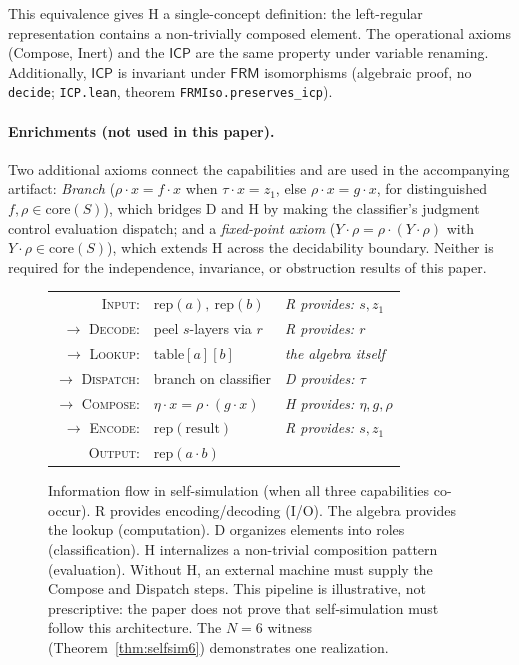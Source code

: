 \documentclass[sigconf,screen,review,anonymous]{acmart}
\newcommand{\dotop}{\cdot}
\newcommand{\FRM}{\textsf{FRM}}
\newcommand{\ICP}{\textsf{ICP}}
\newcommand{\core}{\mathrm{core}}
\theoremstyle{remark}
\begin{document}
This equivalence gives H a single-concept definition: the left-regular representation contains a non-trivially composed element. The operational axioms (Compose, Inert) and the $\ICP$ are the same property under variable renaming. Additionally, $\ICP$ is invariant under $\FRM$ isomorphisms (algebraic proof, no \texttt{decide}; \texttt{ICP.lean}, theorem \texttt{FRMIso.preserves\_icp}).

\paragraph{Enrichments (not used in this paper).}
Two additional axioms connect the capabilities and are used in the accompanying artifact: \emph{Branch} ($\rho \dotop x = f \dotop x$ when $\tau \dotop x = z_1$, else $\rho \dotop x = g \dotop x$, for distinguished $f, \rho \in \core(S)$), which bridges D and H by making the classifier's judgment control evaluation dispatch; and a \emph{fixed-point axiom} ($Y \dotop \rho = \rho \dotop (Y \dotop \rho)$ with $Y \dotop \rho \in \core(S)$), which extends H across the decidability boundary. Neither is required for the independence, invariance, or obstruction results of this paper.

\begin{figure}[t]
\centering
\begin{tabular}{@{}r@{~}l@{\quad}l@{}}
\textsc{Input}: & $\text{rep}(a),\ \text{rep}(b)$ & \emph{R provides: $s, z_1$} \\
$\to$ \textsc{Decode}: & peel $s$-layers via $r$ & \emph{R provides: $r$} \\
$\to$ \textsc{Lookup}: & $\text{table}[a][b]$ & \emph{the algebra itself} \\
$\to$ \textsc{Dispatch}: & branch on classifier & \emph{D provides: $\tau$} \\
$\to$ \textsc{Compose}: & $\eta \dotop x = \rho \dotop (g \dotop x)$ & \emph{H provides: $\eta, g, \rho$} \\
$\to$ \textsc{Encode}: & $\text{rep}(\text{result})$ & \emph{R provides: $s, z_1$} \\
\textsc{Output}: & $\text{rep}(a \dotop b)$ & \\
\end{tabular}
\caption{Information flow in self-simulation (when all three capabilities co-occur). R provides encoding/decoding (I/O). The algebra provides the lookup (computation). D organizes elements into roles (classification). H internalizes a non-trivial composition pattern (evaluation). Without H, an external machine must supply the Compose and Dispatch steps. This pipeline is illustrative, not prescriptive: the paper does not prove that self-simulation must follow this architecture. The $N\!=\!6$ witness (Theorem~\ref{thm:selfsim6}) demonstrates one realization.}
\label{fig:flow}
\end{figure}
\end{document}
